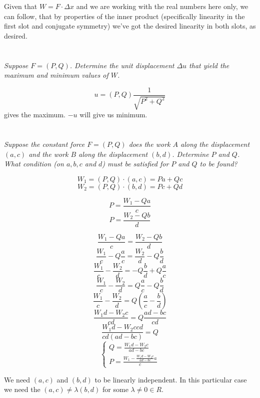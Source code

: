 \documentclass[11pt,oneside,titlepage]{book}
\begin{document}
Given that $W = F \cdot \Delta x$ and we are working with the real numbers here only,
we can follow, that by properties of the inner product (specifically linearity in the first slot
and conjugate symmetry) we've got the desired linearity in both slots, as desired.

\section{}

\textit{Suppose $F = (P, Q)$. Determine the unit displacement $\Delta u$
  that yield the maximum and minimum values of $W$.}

$$u = (P, Q) \frac{1}{\sqrt{P^2 + Q^2}}$$
gives the maximum. $-u$ will give us minimum.

\section{}

\textit{Suppose the constant force $F = (P, Q)$ does the work $A$ along the displacement
  $(a, c)$ and the work $B$ along the displacement $(b, d)$. Determine $P$ and $Q$. What
  condition (on $a, b, c$ and $d$) must be satisfied for $P$ and $Q$ to be found?}

$$W_1 = (P, Q) \cdot (a, c) = Pa + Qc$$
$$W_2 = (P, Q) \cdot (b, d) = Pc + Qd$$

$$P = \frac{W_1 - Qa}{c}$$
$$P = \frac{W_2 - Qb}{d}$$

$$\frac{W_1 - Qa}{c} = \frac{W_2 - Qb}{d}$$
$$\frac{W_1}{c} - Q \frac{a}{ c} = \frac{W_2}{d} - Q\frac{b}{d}$$
$$\frac{W_1}{c} - \frac{W_2}{d}  =  - Q\frac{b}{d} + Q \frac{a}{ c}$$
$$\frac{W_1}{c} - \frac{W_2}{d}  =   Q \frac{a}{ c} - Q\frac{b}{d} $$
$$\frac{W_1}{c} - \frac{W_2}{d}  =   Q \left( \frac{a}{ c} - \frac{b}{d} \right) $$
$$\frac{W_1 d - W_2 c}{cd}  =   Q  \frac{ad - bc }{ cd} $$
$$\frac{W_1 d - W_2 c cd}{cd (ad - bc)}  =   Q   $$
$$
\begin{cases}
  Q = \frac{W_1 d - W_2 c }{ad - bc} \\
  P = \frac{W_1 - \frac{W_1 d - W_2 c }{ad - bc} a}{c}
\end{cases}
$$

We need $(a, c)$ and $(b, d)$ to be linearly independent. In this particular case we need
the $(a, c) \neq \lambda (b, d)$ for some $\lambda \neq 0 \in R$.


\section{}
\end{document}

